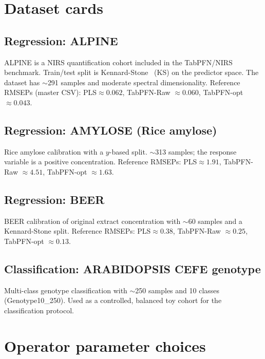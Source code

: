 \documentclass[a4paper,11pt]{article}
\newcommand{\PLS}{\textsc{PLS}}
\begin{document}
\section{Dataset cards}\label{app:datasets}

\subsection{Regression: ALPINE}
ALPINE is a NIRS quantification cohort included in the TabPFN/NIRS
benchmark. Train/test split is Kennard-Stone~\cite{kennard1969computer}
(KS) on the predictor space. The dataset has $\sim$291 samples and
moderate spectral dimensionality. Reference RMSEPs (master CSV):
\PLS $\approx 0.062$, TabPFN-Raw $\approx 0.060$,
TabPFN-opt $\approx 0.043$.

\subsection{Regression: AMYLOSE (Rice amylose)}
Rice amylose calibration with a $y$-based split. $\sim$313 samples;
the response variable is a positive concentration. Reference RMSEPs:
\PLS $\approx 1.91$, TabPFN-Raw $\approx 4.51$,
TabPFN-opt $\approx 1.63$.

\subsection{Regression: BEER}
BEER calibration of original extract concentration with $\sim$60
samples and a Kennard-Stone split. Reference RMSEPs: \PLS $\approx 0.38$,
TabPFN-Raw $\approx 0.25$, TabPFN-opt $\approx 0.13$.

\subsection{Classification: ARABIDOPSIS CEFE genotype}
Multi-class genotype classification with $\sim$250 samples and 10
classes (Genotype10\_250). Used as a controlled, balanced toy cohort for
the classification protocol.

\section{Operator parameter choices}\label{app:operators}
\end{document}
